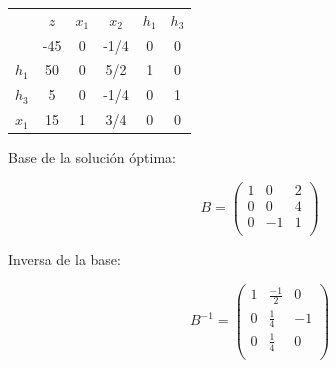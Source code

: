 \begin{center}
\begin{tabular}{c|c|cccc|}
& $z$ & $x_1$ & $x_2$ & $h_1$ & $h_3$\\ 
    & -45 & 0 & -1/4 & 0 & 0  \\ 
\hline
$h_1$ & 50  & 0 & 5/2 & 1 & 0 \\ 
$h_3$ & 5  & 0 & -1/4 & 0 & 1 \\ 
$x_1$ & 15  & 1 & 3/4 & 0 & 0 \\ 
\hline
\end{tabular}
\end{center}


Base de la solución óptima:

\begin{equation}
B = \begin{pmatrix}
1 & 0 & 2\\
0 & 0 & 4\\
0 & -1 & 1\\
\end{pmatrix}
\end{equation}

Inversa de la base:

\begin{equation}
B^{-1} = 
\begin{pmatrix}
1 & \frac{-1}{2} & 0\\
0 & \frac{1}{4} & -1\\
0 & \frac{1}{4} & 0\\
\end{pmatrix}
\end{equation}